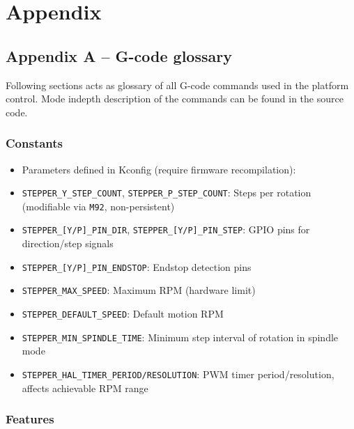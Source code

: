 \chapter*{Appendix}

\section*{Appendix A -- G-code glossary}

Following sections acts as glossary of all G-code commands used in the platform control. Mode indepth description of the commands can be found in the source code.

\subsection*{Constants}

\begin{itemize}
  \item Parameters defined in Kconfig (require firmware recompilation):
  \item \texttt{STEPPER\_Y\_STEP\_COUNT}, \texttt{STEPPER\_P\_STEP\_COUNT}: Steps per rotation (modifiable via \texttt{M92}, non-persistent)
  \item \texttt{STEPPER\_[Y/P]\_PIN\_DIR}, \texttt{STEPPER\_[Y/P]\_PIN\_STEP}: GPIO pins for direction/step signals
  \item \texttt{STEPPER\_[Y/P]\_PIN\_ENDSTOP}: Endstop detection pins
  \item \texttt{STEPPER\_MAX\_SPEED}: Maximum RPM (hardware limit)
  \item \texttt{STEPPER\_DEFAULT\_SPEED}: Default motion RPM
  \item \texttt{STEPPER\_MIN\_SPINDLE\_TIME}: Minimum step interval of rotation in spindle mode
  \item \texttt{STEPPER\_HAL\_TIMER\_PERIOD/RESOLUTION}: PWM timer period/resolution, affects achievable RPM range
\end{itemize}

\subsection*{Features}

